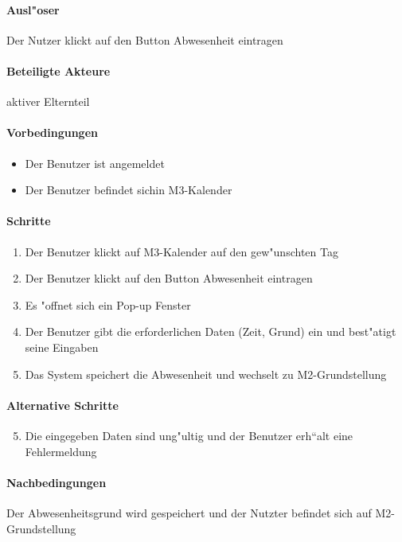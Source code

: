   \paragraph{Ausl"oser}
  Der Nutzer klickt auf den Button \dq Abwesenheit eintragen\dq
  \paragraph{Beteiligte Akteure}   \leavevmode \newline
    aktiver Elternteil
  \paragraph{Vorbedingungen}
  \begin{itemize}
   \item Der Benutzer ist angemeldet
   \item Der Benutzer befindet sichin M3-Kalender
  \end{itemize}

  \paragraph{Schritte}
  \begin{enumerate}
   \item Der Benutzer klickt auf M3-Kalender auf den gew"unschten Tag
   \item Der Benutzer klickt auf den Button \dq Abwesenheit eintragen\dq
   \item Es "offnet sich ein Pop-up Fenster
   \item Der Benutzer gibt die erforderlichen Daten (Zeit, Grund) ein und best"atigt seine Eingaben
   \item Das System speichert die Abwesenheit und wechselt zu M2-Grundstellung
  \end{enumerate}

  \paragraph{Alternative Schritte}
  \begin{enumerate}
  \setcounter{enumi}{4}
   \item Die eingegeben Daten sind ung"ultig und der Benutzer erh``alt eine Fehlermeldung
  \end{enumerate}

  \paragraph{Nachbedingungen}
  Der Abwesenheitsgrund wird gespeichert und der Nutzter befindet sich auf M2-Grundstellung

